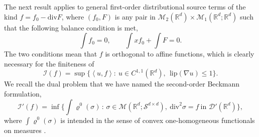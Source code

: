 \documentclass[11pt,letterpaper,reqno]{amsart}
\theoremstyle{definition}
\numberwithin{equation}{section}
\newcommand{\R}{\mathbb{R}}
\newcommand{\Rd}{\R^d}
\newcommand{\Mes}{{\mathcal{M}}}
\newcommand{\dive}{{\mathrm{div}}}
\newcommand{\pairing}[1]{{\left \langle #1 \right \rangle}}
\newcommand{\Lip}{{\mathrm{lip}}}
\newcommand{\I}{\mathcal{I}}
\newcommand{\D}{\mathcal{D}}
\newcommand{\Sdd}{{\mathcal{S}^{d \times d}}}
\begin{document}
The next result applies to general first-order distributional source terms  of the kind $f = f_0 - \dive F$, where
 $(f_0, F)$ is any pair in $\Mes_2(\R^d)\times\Mes_1(\R^d;\R^d)$ such that the following balance condition is met,
\begin{equation}\label{genload}
  \int f_0=0, \qquad  {\int x f_0 + \int F=0
} .
\end{equation}
The two conditions  mean that $f$ is orthogonal to affine functions, which  is clearly necessary for the finiteness of
\begin{equation}
	\label{If}
	 \I(f) =  \sup\Big\{ \pairing{u,f} :\ u\in C^{1,1}(\R^d),\ \ \Lip(\nabla u)\le 1  \Big\}.
\end{equation}
We recall the dual problem that we have named the second-order Beckmann formulation,
\begin{equation}
	\label{Ifprime}
	\I'(f) = \inf \biggl\{ \int \varrho^0(\sigma) \, : \, \sigma \in \Mes(\R^d;\Sdd), \  \dive^2 \sigma = f \ \text{in } \D'(\Rd) \biggr\} ,
\end{equation}
where  $\int \varrho^0(\sigma)$ is intended in the sense of convex one-homogeneous functionals on measures 
 \cite{Goffman}.
 
\end{document}
